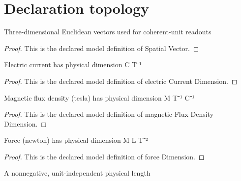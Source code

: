 \section{Declaration topology}
\begin{definition}
  \label{def:physics:phyx-mini-0950:phyxminiproblems-problemphyxmini0950-spatialvector}
  Three-dimensional Euclidean vectors used for coherent-unit readouts
\end{definition}
\begin{proof}
  This is the declared model definition of Spatial Vector.
\end{proof}
\begin{definition}
  \label{def:physics:phyx-mini-0950:phyxminiproblems-problemphyxmini0950-electriccurrentdimension}
  Electric current has physical dimension C T⁻¹
\end{definition}
\begin{proof}
  This is the declared model definition of electric Current Dimension.
\end{proof}
\begin{definition}
  \label{def:physics:phyx-mini-0950:phyxminiproblems-problemphyxmini0950-magneticfluxdensitydimension}
  Magnetic flux density (tesla) has physical dimension M T⁻¹ C⁻¹
\end{definition}
\begin{proof}
  This is the declared model definition of magnetic Flux Density Dimension.
\end{proof}
\begin{definition}
  \label{def:physics:phyx-mini-0950:phyxminiproblems-problemphyxmini0950-forcedimension}
  Force (newton) has physical dimension M L T⁻²
\end{definition}
\begin{proof}
  This is the declared model definition of force Dimension.
\end{proof}
\begin{definition}
  \label{def:physics:phyx-mini-0950:phyxminiproblems-problemphyxmini0950-lengthquantity}
  A nonnegative, unit-independent physical length
\end{definition}
